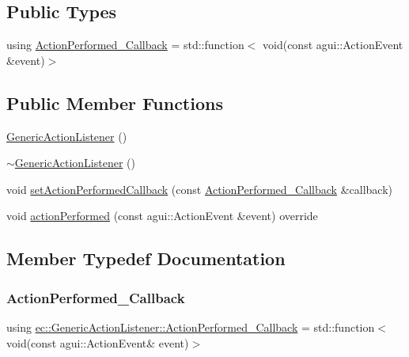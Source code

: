 \subsection*{Public Types}
\begin{DoxyCompactItemize}
\item 
using \mbox{\hyperlink{classec_1_1_generic_action_listener_ab58c5e9b4caf14e4d1b1e50ffff5e628}{Action\+Performed\+\_\+\+Callback}} = std\+::function$<$ void(const agui\+::\+Action\+Event \&event)$>$
\end{DoxyCompactItemize}
\subsection*{Public Member Functions}
\begin{DoxyCompactItemize}
\item 
\mbox{\hyperlink{classec_1_1_generic_action_listener_a70e7395994a0e7ff72e0af59d1f0d20d}{Generic\+Action\+Listener}} ()
\item 
\mbox{\hyperlink{classec_1_1_generic_action_listener_a4b840d6f59d0e222121b15ba45bd4c3c}{$\sim$\+Generic\+Action\+Listener}} ()
\item 
void \mbox{\hyperlink{classec_1_1_generic_action_listener_ae824ead75dce8eae0910da7432e3c400}{set\+Action\+Performed\+Callback}} (const \mbox{\hyperlink{classec_1_1_generic_action_listener_ab58c5e9b4caf14e4d1b1e50ffff5e628}{Action\+Performed\+\_\+\+Callback}} \&callback)
\item 
void \mbox{\hyperlink{classec_1_1_generic_action_listener_a559a752b60543f5deabfccb2eb6efaf8}{action\+Performed}} (const agui\+::\+Action\+Event \&event) override
\end{DoxyCompactItemize}


\subsection{Member Typedef Documentation}
\mbox{\label{classec_1_1_generic_action_listener_ab58c5e9b4caf14e4d1b1e50ffff5e628}} 
\subsubsection{\texorpdfstring{Action\+Performed\+\_\+\+Callback}{ActionPerformed\_Callback}}
{\footnotesize\ttfamily using \mbox{\hyperlink{classec_1_1_generic_action_listener_ab58c5e9b4caf14e4d1b1e50ffff5e628}{ec\+::\+Generic\+Action\+Listener\+::\+Action\+Performed\+\_\+\+Callback}} =  std\+::function$<$void(const agui\+::\+Action\+Event\& event)$>$}



